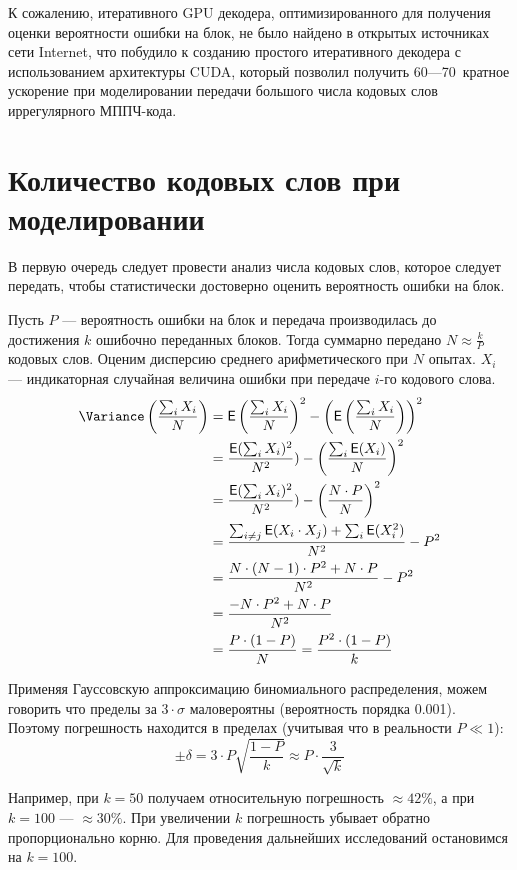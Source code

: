 К сожалению, итеративного GPU декодера, оптимизированного для получения оценки вероятности ошибки на блок,
не было найдено в открытых источниках сети Internet, что побудило к созданию простого итеративного декодера
с использованием архитектуры CUDA, который позволил получить \mbox{60---70 кратное} ускорение при моделировании
передачи большого числа кодовых слов иррегулярного МППЧ-кода.

\section{Количество кодовых слов при моделировании}

В первую очередь следует провести анализ числа кодовых слов, которое следует передать, чтобы 
статистически достоверно оценить вероятность ошибки на блок.

Пусть $P$ --- вероятность ошибки на блок и передача производилась до достижения $k$ ошибочно переданных блоков.
Тогда суммарно передано $N\approx \frac{k}{P}$ кодовых слов. Оценим дисперсию среднего арифметического при 
$N$ опытах. $X_i$ --- индикаторная случайная величина ошибки при передаче $i$-го кодового слова. 
\newcommand{\Expect}{\mathsf{E}}
\[
	\begin{split}
	\Variance \left({\frac{\sum_i{X_i}}{N}}\right) & =
	\Expect \left(\frac{\sum_i{X_i}}{N}\right)^2-\left(\Expect \left(\frac{\sum_i{X_i}}{N}\right)\right)^2 \\
	& = \frac{\Expect(\sum_i{X_i})^2}{N^2})-\left(\frac{\sum_i{\Expect(X_i)}}{N}\right)^2 \\
	& = \frac{\Expect(\sum_i{X_i})^2}{N^2})-\left(\frac{N \cdot P}{N}\right)^2 \\
	& = \frac{\sum_{i \neq j}{\Expect(X_i \cdot X_j)} + \sum_i{\Expect(X_i^2)}}{N^2}-P^2 \\
	& = \frac{N \cdot (N - 1) \cdot P^2 + N \cdot P}{N^2}-P^2 \\
	& = \frac{-N \cdot P^2 + N \cdot P}{N^2} \\
	& = \frac{P \cdot (1 - P)}{N}  = \frac{P^2 \cdot (1 - P)}{k}
	\end{split}
\]

Применяя Гауссовскую аппроксимацию биномиального распределения, можем говорить что пределы за $3\cdot \sigma$
маловероятны (вероятность порядка 0.001). Поэтому погрешность находится в пределах (учитывая что в реальности
$P \ll 1$):
\[
\pm \delta = 3 \cdot P \sqrt{\frac{1 - P}{k}} \approx P \cdot \frac{3}{\sqrt{k}} 
\]	 

Например, при $k=50$ получаем относительную погрешность $\approx 42\%$, 
а при $k=100$ --- $\approx 30\%$. При увеличении $k$ погрешность убывает обратно пропорционально корню.
Для проведения дальнейших исследований остановимся на $k=100$.

